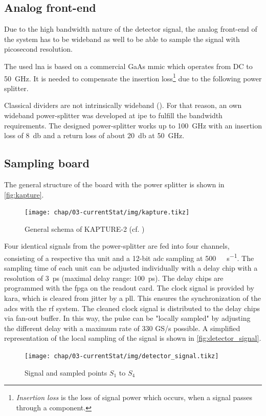 \subsection{Analog front-end}
Due to the high bandwidth nature of the detector signal, the analog front-end of the system has to be wideband as well to be able to sample the signal with picosecond resolution. 

The used \gls{lna} is based on a commercial GaAs \gls{mmic} which operates from DC to \SI{50}{\giga \hertz}. It is needed to compensate the insertion loss\footnote{\textit{Insertion loss} is the loss of signal power which occurs, when a signal passes through a component.} due to the following power splitter. %

Classical dividers are not intrinsically wideband (\cite{caselle2014}). For that reason, an own wideband power-splitter was developed at \gls{ipe} to fulfill the bandwidth requirements. The designed power-splitter works up to \SI{100}{\giga \hertz} with an insertion loss of \SI{8}{\decibel} and a return loss of about \SI{20}{\decibel} at \SI{50}{\giga \hertz}.\cite{caselle2014}

\subsection{Sampling board}
The general structure of the board with the power splitter is shown in \autoref{fig:kapture}. 
\begin{figure}[tbh]
	\centering
	\texttt{[image: chap/03-currentStat/img/kapture.tikz]}
	\caption{General schema of KAPTURE-2 (cf. \cite[p.2]{caselleKAP})}
	\label{fig:kapture}
\end{figure}

Four identical signals from the power-splitter are fed into four channels, consisting of a respective \gls{tha} unit and a 12-bit \gls{adc} sampling at \SI{500}{\mega\sample\per\second}. The sampling time of each unit can be adjusted individually with a delay chip with a resolution of \SI{3}{\pico \second} (maximal delay range: \SI{100}{\pico \second}). The delay chips are programmed with the \gls{fpga} on the readout card.
The clock signal is provided by \gls{kara}, which is cleared from jitter by a \gls{pll}. This ensures the synchronization of the \glspl{adc} with the \gls{rf} system. The cleaned clock signal is distributed to the delay chips via fan-out buffer. \cite{caselleKAP}
In this way, the pulse can be "locally sampled" by adjusting the different delay with a maximum rate of 330 GS/s possible. 
A simplified representation of the local sampling of the signal is shown in \autoref{fig:detector_signal}.
\begin{figure}[tbh]
	\centering
	\texttt{[image: chap/03-currentStat/img/detector\_signal.tikz]}
	\caption{Signal and sampled points $S_1$ to $S_4$}
	\label{fig:detector_signal}
\end{figure}

